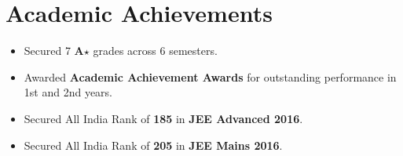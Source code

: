 \section*{Academic Achievements}
\begin{itemize}[itemsep=0mm]

\item Secured 7 \textbf{A$\star$} grades across 6 semesters.
\item Awarded \textbf{Academic Achievement Awards} for outstanding performance in 1st and 2nd years.
\item Secured All India Rank of {\bf 185} in {\bf JEE Advanced 2016}.
\item Secured All India Rank of {\bf 205} in {\bf JEE Mains 2016}.

\end{itemize}
